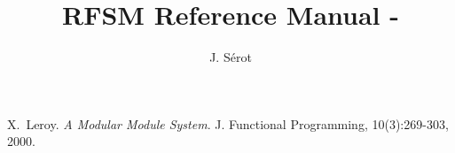 \documentclass[a4paper]{report}
\title{RFSM Reference Manual - \version}
\author{J. S\'erot}
\date{}
\begin{document}
\maketitle



   

   

% 
% 

\newpage{}
\begin{thebibliography}{99}

 X.~Leroy. \emph{A Modular Module System}. J. Functional Programming,
  10(3):269-303, 2000. 

\end{thebibliography}
\end{document}
